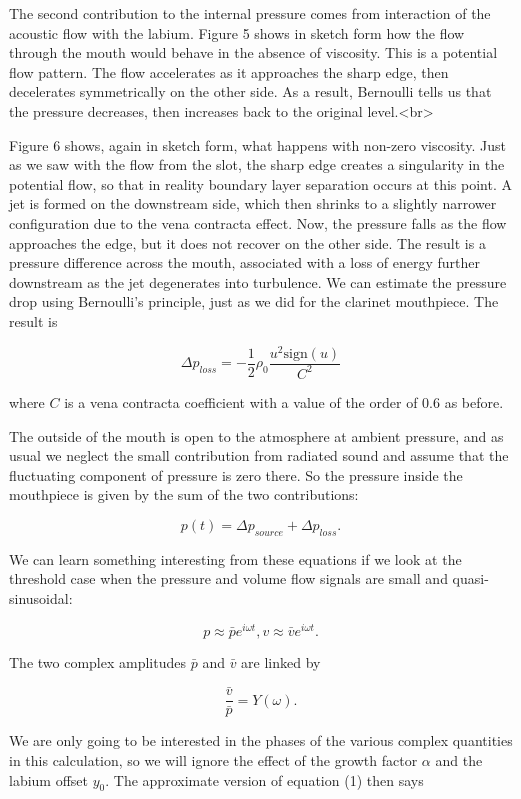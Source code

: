   The second contribution to the internal pressure comes from interaction of 
  the acoustic flow with the labium. Figure 5 shows in sketch form how the flow 
  through the mouth would behave in the absence of viscosity. This is a 
  potential flow pattern. The flow accelerates as it approaches the sharp edge, 
  then decelerates symmetrically on the other side. As a result, Bernoulli 
  tells us that the pressure decreases, then increases back to the original 
  level.<br> 

  Figure 6 shows, again in sketch form, what happens with non-zero viscosity. 
  Just as we saw with the flow from the slot, the sharp edge creates a 
  singularity in the potential flow, so that in reality boundary layer 
  separation occurs at this point. A jet is formed on the downstream side, 
  which then shrinks to a slightly narrower configuration due to the vena 
  contracta effect. Now, the pressure falls as the flow approaches the edge, 
  but it does not recover on the other side. The result is a pressure 
  difference across the mouth, associated with a loss of energy further 
  downstream as the jet degenerates into turbulence. We can estimate the 
  pressure drop using Bernoulli's principle, just as we did for the clarinet 
  mouthpiece. The result is 

  $$\Delta p_{loss} = -\dfrac{1}{2} \rho_0 \dfrac{u^2 \mathrm{sign}(u)}{C^2} 
  \tag{9}$$ 

  where $C$ is a vena contracta coefficient with a value of the order of 0.6 as 
  before. 

  The outside of the mouth is open to the atmosphere at ambient pressure, and 
  as usual we neglect the small contribution from radiated sound and assume 
  that the fluctuating component of pressure is zero there. So the pressure 
  inside the mouthpiece is given by the sum of the two contributions: 

  $$p(t)=\Delta p_{source} + \Delta p_{loss} . \tag{10}$$ 

  We can learn something interesting from these equations if we look at the 
  threshold case when the pressure and volume flow signals are small and 
  quasi-sinusoidal: 

  $$p \approx \bar{p}e^{i \omega t}, v \approx \bar{v}e^{i \omega t} . 
  \tag{11}$$ 

  The two complex amplitudes $\bar{p}$ and $\bar{v}$ are linked by 

  $$\dfrac{\bar{v}}{\bar{p}} = Y(\omega) . \tag{12}$$ 

  We are only going to be interested in the phases of the various complex 
  quantities in this calculation, so we will ignore the effect of the growth 
  factor $\alpha$ and the labium offset $y_0$. The approximate version of 
  equation (1) then says 

